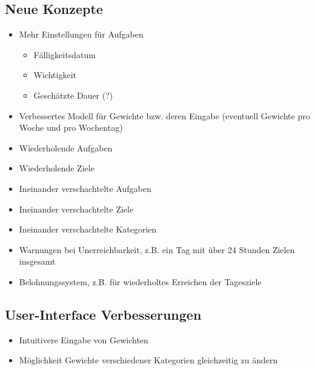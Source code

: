 \documentclass[10pt,a4paper]{article}
\begin{document}
\subsection{Neue Konzepte}
\begin{itemize}
	\item Mehr Einstellungen für Aufgaben
	\begin{itemize}
		\item Fälligkeitsdatum
		\item Wichtigkeit
		\item Geschätzte Dauer (?)
	\end{itemize}
	\item Verbessertes Modell für Gewichte bzw. deren Eingabe (eventuell Gewichte pro Woche und pro Wochentag)
	\item Wiederholende Aufgaben
	\item Wiederholende Ziele
	\item Ineinander verschachtelte Aufgaben
	\item Ineinander verschachtelte Ziele
	\item Ineinander verschachtelte Kategorien
	\item Warnungen bei Unerreichbarkeit, z.B. ein Tag mit über 24 Stunden Zielen insgesamt
	\item Belohnungssystem, z.B. für wiederholtes Erreichen der Tagesziele
\end{itemize}
\subsection{User-Interface Verbesserungen}
\begin{itemize}
	\item Intuitivere Eingabe von Gewichten
	\item Möglichkeit Gewichte verschiedener Kategorien gleichzeitig zu ändern
\end{itemize}
\end{document}
